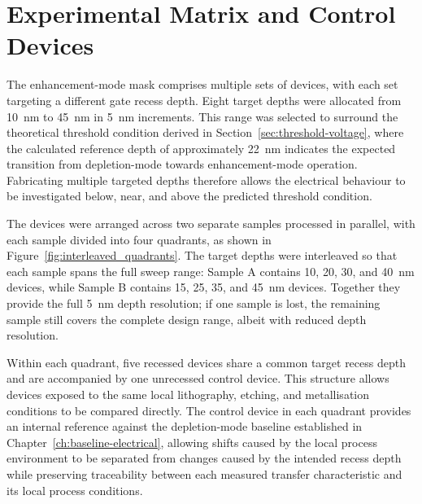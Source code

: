 \vspace{5mm}



\FloatBarrier


\section{Experimental Matrix and Control Devices}

\vspace{1mm}

The enhancement-mode mask comprises multiple sets of devices, with each set
targeting a different gate recess depth. Eight target depths were
allocated from 10~nm to 45~nm in 5~nm increments. This range was selected to
surround the theoretical threshold condition derived in
Section~\ref{sec:threshold-voltage}, where the calculated reference depth of
approximately 22~nm indicates the expected transition from depletion-mode
towards enhancement-mode operation. Fabricating multiple targeted depths
therefore allows the electrical behaviour to be investigated below, near, and
above the predicted threshold condition.

The devices were arranged across two separate samples processed in parallel,
with each sample divided into four quadrants, as shown in
Figure~\ref{fig:interleaved_quadrants}. The target depths were interleaved so
that each sample spans the full sweep range: Sample A contains 10, 20, 30,
and 40~nm devices, while Sample B contains 15, 25, 35, and 45~nm devices.
Together they provide the full 5~nm depth resolution; if one sample is lost,
the remaining sample still covers the complete design range, albeit with
reduced depth resolution.

Within each quadrant, five recessed devices share a common target recess depth
and are accompanied by one unrecessed control device. This structure allows
devices exposed to the same local lithography, etching, and metallisation
conditions to be compared directly. The control device in each quadrant
provides an internal reference against the depletion-mode baseline established
in Chapter~\ref{ch:baseline-electrical}, allowing shifts caused by the local
process environment to be separated from changes caused by the intended recess
depth while preserving traceability between each measured transfer
characteristic and its local process conditions.

\vspace{3mm}

